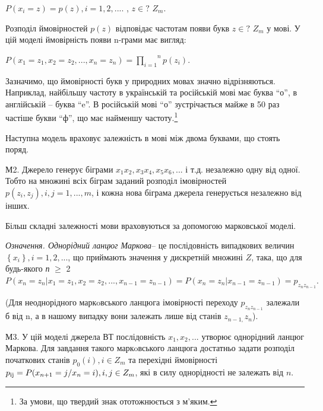 \documentclass[a4paper]{article}
\newcounter{}
\newcommand\normalsubformula[1]{\text{\mathversion{normal}$#1$}}
\begin{document}
{\centering
 ${P\left(x_{{i}}=z\right)=p(z),i=1,2,\text{.}\text{.}\text{.}}$.  ,  ${z\in ?}$
${Z_{{m}}}$.
\par}

Розподіл ймовірностей  ${p(z)}$ відповідає частотам появи букв  ${z\in ?}$
${Z_{{m}}}$ у мові. У цій моделі ймовірність появи n-грами має вигляд:

{\centering

${P\left(x_{{1}}=z_{{1}},x_{{2}}=z_{{2}},\text{.}\text{.}\text{.},x_{{n}}=z_{{n}}\right)=\overset{{n}}{\underset{{i=1}}{\prod
}}{p(z_{{i}})}}$.
\par}

Зазначимо, що ймовірності букв у природних мовах значно відрізняються.
Наприклад, найбільшу частоту в українській та російській мові має буква “о”, в
англійській – буква “e”. В російській мові “о” зустрічається майже в 50 раз
частіше букви “ф”, що має найменшу частоту.\footnote{ За умови, що твердий знак
ототожнюється з м’яким.}

Наступна модель враховує залежність в мові між двома буквами, що стоять поряд.

М2. Джерело генерує біграми 
${x_{{1}}x_{{2}},x_{{3}}x_{{4}},x_{{5}}x_{{6}},\text{.}\text{.}\text{.}}$ і
т.д. незалежно одну від одної. Тобто на множині всіх біграм заданий розподіл
імовірностей  ${p(z_{{i}},z_{{j}}),i,j=1,\text{.}\text{.}\text{.},m}$, і кожна
нова біграма джерела генерується незалежно від інших.

Більш складні залежності мови враховуються за допомогою марковської моделі.

\textit{Означення}\textit{. Однорідний ланцюг Маркова}– це послідовність
випадкових величин  
${\left\{x_{{i}}\right.\left.\right\},i=1,2,\text{.}\text{.}\text{.}}$, що 
приймають значення у дискретній множині  ${Z}$, така, що для будь-якого 
\textit{п }${\geq}$ 2 
${P\left(x_{{n}}=z_{{n}}|x_{{1}}=z_{{1}},x_{{2}}=z_{{2}},\text{.}\text{.}\text{.},x_{{n-1}}=z_{{n-1}}\right)=P\left(x_{{n}}=z_{{n}}|x_{{n-1}}=z_{{n-1}}\right)=p_{{z_{{n}}z_{{n-1}}}}\text{.}}$

 (Для неоднорідного маркoвського ланцюга імовірності переходу 
${p_{{z_{{n}}z_{{n-1}}}}}$ залежали б від n, а в нашому випадку вони залежать
лише від станів  ${z_{{n-1,}}z_{{n}}}$).

М3. У цій моделі джерела ВТ послідовність 
${x_{{1}},x_{{2}},\text{.}\text{.}\text{.}}$  утворює однорідний ланцюг
Маркова. Для завдання такого маркoвського ланцюга достатньо задати розподіл
початкових станів  ${p_{{0}}(i),i\in Z_{{m}}}$ та перехідні ймовірності 
${p_{{\normalsubformula{\text{ij}}}}=P(x_{{n+1}}=j/x_{{n}}=i),i,j\in Z_{{m}}}$,
які в силу однорідності не залежать від  ${n}$.
\end{document}
